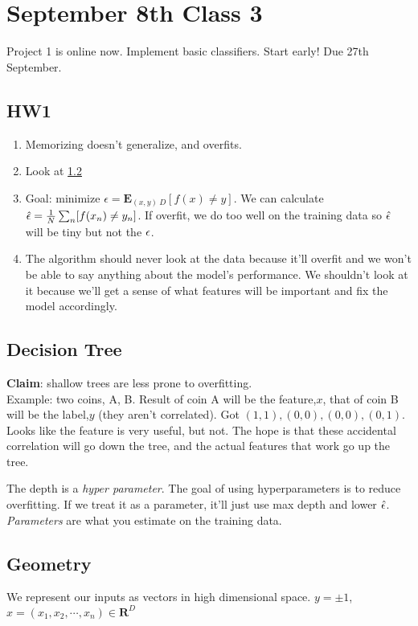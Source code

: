 \pagebreak
\section{September 8th Class 3}
\label{sec:class3}

Project 1 is online now. Implement basic classifiers. Start early! Due
27th September.

\subsection{HW1}
\label{sec:hw1}

\begin{enumerate}
\item Memorizing doesn't generalize, and overfits.
\item Look at \ref{sec:decisiontree}
\item Goal: minimize $\epsilon = \mathbf{E}_{(x,y)~D}[f(x)\neq y]$. We
  can calculate $\hat{\epsilon} =\frac{1}{N}\sum_n[f(x_n)\neq y_n]$. If
  overfit, we do too well on the training data so $\hat {\epsilon}$ will
  be tiny but not the $\epsilon$.
\item The algorithm should never look at the data because it'll overfit and we won't
  be able to say anything about the model's performance. We shouldn't
  look at it because we'll get a sense of what features will be
  important and fix the model accordingly.
\end{enumerate}

\subsection{Decision Tree}
\label{sec:decisiontree}
\textbf{Claim}: shallow trees are less prone to overfitting.\\
\noi
Example: two coins, A, B. Result of coin A will be the feature,$x$, that
of coin B will be the label,$y$ (they aren't correlated). Got $(1,1),
(0,0), (0,0), (0,1)$. Looks like the feature is very useful, but
not. The hope is that these accidental correlation will go down the
tree, and the actual features that work go up the tree.

The depth is a \emph{hyper parameter}. The goal of using
hyperparameters is to reduce overfitting. If we treat it as a
parameter, it'll just use max depth and lower $\hat
{\epsilon}$.  \emph{Parameters} are what you estimate on the training data.
  
\subsection{Geometry}
\label{sec:geometry}
We represent our inputs as vectors in high dimensional space. $y =
\pm1$, $x = (x_1, x_2, \cdots, x_n) \in \mathbf{R}^D$

